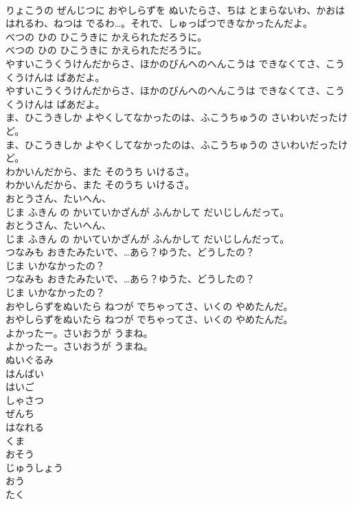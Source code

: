 \documentclass[8pt]{extreport}
\begin{document}
\begin{CJK}{UTF8}{min}
\\	りょこうの ぜんじつに おやしらずを ぬいたらさ、ちは とまらないわ、かおは はれるわ、ねつは でるわ…。それで、しゅっぱつできなかったんだよ。
\\	べつの ひの ひこうきに かえられただろうに。
\\	べつの ひの ひこうきに かえられただろうに。
\\	やすいこうくうけんだからさ、ほかのびんへのへんこうは できなくてさ、こうくうけんは ぱあだよ。
\\	やすいこうくうけんだからさ、ほかのびんへのへんこうは できなくてさ、こうくうけんは ぱあだよ。
\\	ま、ひこうきしか よやくしてなかったのは、ふこうちゅうの さいわいだったけど。
\\	ま、ひこうきしか よやくしてなかったのは、ふこうちゅうの さいわいだったけど。
\\	わかいんだから、また そのうち いけるさ。
\\	わかいんだから、また そのうち いけるさ。
\\	おとうさん、たいへん、
\\	じま ふきん の かいていかざんが ふんかして だいじしんだって。
\\	おとうさん、たいへん、
\\	じま ふきん の かいていかざんが ふんかして だいじしんだって。
\\	つなみも おきたみたいで、…あら？ゆうた、どうしたの？
\\	じま いかなかったの？
\\	つなみも おきたみたいで、…あら？ゆうた、どうしたの？
\\	じま いかなかったの？
\\	おやしらずをぬいたら ねつが でちゃってさ、いくの やめたんだ。
\\	おやしらずをぬいたら ねつが でちゃってさ、いくの やめたんだ。
\\	よかったー。さいおうが うまね。
\\	よかったー。さいおうが うまね。
\\	ぬいぐるみ
\\	はんばい
\\	はいご
\\	しゃさつ
\\	ぜんち
\\	はなれる
\\	くま
\\	おそう
\\	じゅうしょう
\\	おう
\\	たく

\end{CJK}
\end{document}
